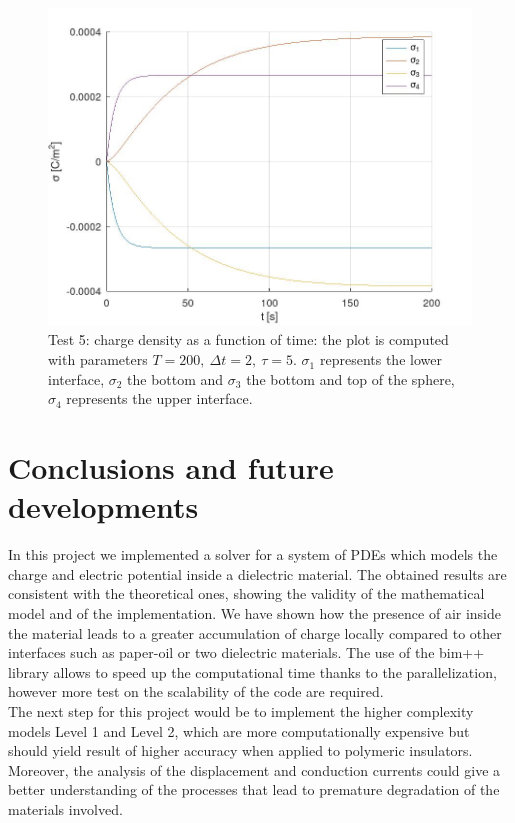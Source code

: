 \documentclass{Configuration_Files/PoliMi3i_thesis}
\begin{document}
\begin{figure}[h!]
    \centering
   \includegraphics[scale=0.2]{Images/5.rho_time.jpeg}
    \caption {Test 5: charge density as a function of time: the plot is computed with parameters $T=200,\ \Delta t=2,\ \tau=5$. $\sigma_1$ represents the lower interface, $\sigma_2$ the bottom and $\sigma_3$ the bottom and top of the sphere, $\sigma_4$ represents the upper interface.}
    \label{fig: 5.4}
\end{figure}

\chapter{Conclusions and future developments} 
In this project we implemented a solver for a system of PDEs which models the charge and electric potential inside a dielectric material. The obtained results are consistent with the theoretical ones, showing the validity of the mathematical model and of the implementation. We have shown how the presence of air inside the material leads to a greater accumulation of charge locally compared to other interfaces such as paper-oil or two dielectric materials.
The use of the bim++ library allows to speed up the computational time thanks to the parallelization, however more test on the scalability of the code are required.
\\The next step for this project would be to implement the higher complexity models Level 1 and Level 2, which are more computationally expensive but should yield result of higher accuracy when applied to polymeric insulators. Moreover, the analysis of the displacement and conduction currents could give a better understanding of the processes that lead to premature degradation of the materials involved.


\end{document}
